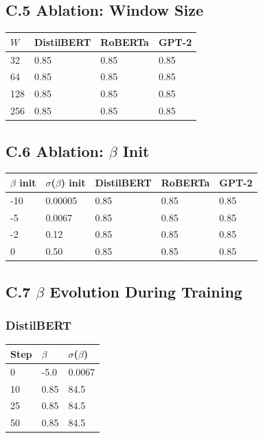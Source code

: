 \subsection{C.5 Ablation: Window Size}

\begin{table}[H]
\centering
\small
\begin{tabular}{llll}
\toprule
\textbf{$W$} & \textbf{DistilBERT} & \textbf{RoBERTa} & \textbf{GPT-2} \\
\midrule
32 & 0.85 & 0.85 & 0.85 \\
64 & 0.85 & 0.85 & 0.85 \\
128 & 0.85 & 0.85 & 0.85 \\
256 & 0.85 & 0.85 & 0.85 \\
\bottomrule
\end{tabular}
\end{table}

\subsection{C.6 Ablation: $\beta$ Init}

\begin{table}[H]
\centering
\small
\begin{tabular}{lllll}
\toprule
\textbf{$\beta$ init} & \textbf{$\sigma$($\beta$) init} & \textbf{DistilBERT} & \textbf{RoBERTa} & \textbf{GPT-2} \\
\midrule
-10 & 0.00005 & 0.85 & 0.85 & 0.85 \\
-5 & 0.0067 & 0.85 & 0.85 & 0.85 \\
-2 & 0.12 & 0.85 & 0.85 & 0.85 \\
0 & 0.50 & 0.85 & 0.85 & 0.85 \\
\bottomrule
\end{tabular}
\end{table}

\subsection{C.7 $\beta$ Evolution During Training}

\subsubsection{DistilBERT}

\begin{table}[H]
\centering
\small
\begin{tabular}{lll}
\toprule
\textbf{Step} & \textbf{$\beta$} & \textbf{$\sigma$($\beta$)} \\
\midrule
0 & -5.0 & 0.0067 \\
10 & 0.85 & 84.5 \\
25 & 0.85 & 84.5 \\
50 & 0.85 & 84.5 \\
\bottomrule
\end{tabular}
\end{table}

